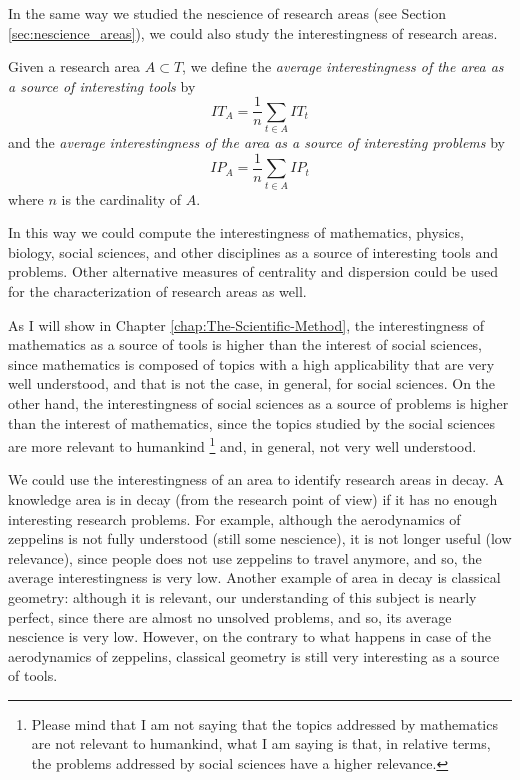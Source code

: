 In the same way we studied the nescience of research areas (see Section \ref{sec:nescience_areas}), we could also study the interestingness of research areas.

\begin{definition}
Given a research area $A\subset T$, we define the \emph{average interestingness
of the area as a source of interesting tools} by
\[
IT_{A}=\frac{1}{n}\sum_{t\in A}IT_{t}
\]
and the \emph{average interestingness of the area as a source of interesting
problems} by
\[
IP_{A}=\frac{1}{n}\sum_{t\in A}IP_{t}
\]
where $n$ is the cardinality of $A$.
\end{definition}

In this way we could compute the interestingness of mathematics, physics, biology, social sciences, and other disciplines as a source of interesting tools and problems. Other alternative measures of centrality and dispersion could be used for the characterization of research areas as well.

As I will show in Chapter \ref{chap:The-Scientific-Method}, the interestingness of mathematics as a source of tools is higher than the interest of social sciences, since mathematics is composed of topics with a high applicability that are very well understood, and that is not the case, in general, for social sciences. On the other hand, the interestingness of social sciences as a source of problems is higher than the interest of mathematics, since the topics studied by the social sciences are more relevant to humankind \footnote{Please mind that I am not saying that the topics addressed by mathematics are not relevant to humankind, what I am saying is that, in relative terms, the problems addressed by social sciences have a higher relevance.} and, in general, not very well understood.

\begin{example}
We could use the interestingness of an area to identify research areas in decay. A knowledge area is in decay (from the research point of view) if it has no enough interesting research problems. For example, although the aerodynamics of zeppelins is not fully understood (still some nescience), it is not longer useful (low relevance), since people does not use zeppelins to travel anymore, and so, the average interestingness is very low. Another example of area in decay is classical geometry: although it is relevant, our understanding of this subject is nearly perfect, since there are almost no unsolved problems, and so, its average nescience is very low. However, on the contrary to what happens in case of the aerodynamics of zeppelins, classical geometry is still very interesting as a source of tools.
\end{example}

